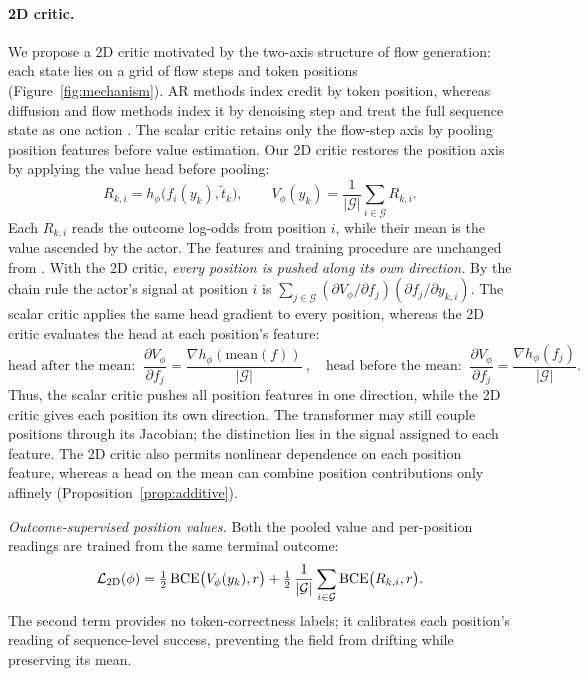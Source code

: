 \paragraph{2D critic.}
We propose a 2D critic motivated by the two-axis structure of flow generation: each state lies on a grid of flow steps and token positions (Figure~\ref{fig:mechanism}). AR methods index credit by token position, whereas diffusion and flow methods index it by denoising step and treat the full sequence state as one action \citep{liu2025flowgrpo,xue2025dancegrpo}. The scalar critic retains only the flow-step axis by pooling position features before value estimation. Our 2D critic restores the position axis by applying the value head before pooling:
\begin{equation}
R_{k,i}
=
h_\phi\bigl(f_i(y_k),\tilde t_k\bigr),
\qquad
V_\phi(y_k)
=
\frac{1}{|\mathcal G|}
\sum_{i\in\mathcal G}R_{k,i}.
\label{eq:critic2d}
\end{equation}
Each $R_{k,i}$ reads the outcome log-odds from position $i$, while their mean is the value ascended by the actor. The features and training procedure are unchanged from \methodSVGScalar{}. With the 2D critic, \emph{every position is pushed along its own direction.} By the chain rule the actor's signal at position $i$ is $\sum_{j\in\mathcal G}(\partial V_\phi/\partial f_j)(\partial f_j/\partial y_{k,i})$. The scalar critic applies the same head gradient to every position, whereas the 2D critic evaluates the head at each position's feature:
\begin{equation}
\text{head after the mean: }\ \frac{\partial V_\phi}{\partial f_j}=\frac{\nabla h_\phi(\mathrm{mean}(f))}{|\mathcal G|}\ ,\quad \text{head before the mean: }\ \frac{\partial V_\phi}{\partial f_j}=\frac{\nabla h_\phi(f_j)}{|\mathcal G|}.
\label{eq:headgrad}
\end{equation}
Thus, the scalar critic pushes all position features in one direction, while the 2D critic gives each position its own direction. The transformer may still couple positions through its Jacobian; the distinction lies in the signal assigned to each feature. The 2D critic also permits nonlinear dependence on each position feature, whereas a head on the mean can combine position contributions only affinely (Proposition~\ref{prop:additive}).

\emph{Outcome-supervised position values.} Both the pooled value and per-position readings are trained from the same terminal outcome:
\begin{equation}
\mathcal L_{\rm 2D}(\phi)=\tfrac12\,\mathrm{BCE}\bigl(V_\phi(y_k),r\bigr)+\tfrac12\,\frac1{|\mathcal G|}\sum_{i\in\mathcal G}\mathrm{BCE}\bigl(R_{k,i},r\bigr).
\label{eq:critic2d_loss}
\end{equation}
The second term provides no token-correctness labels; it calibrates each position's reading of sequence-level success, preventing the field from drifting while preserving its mean.

